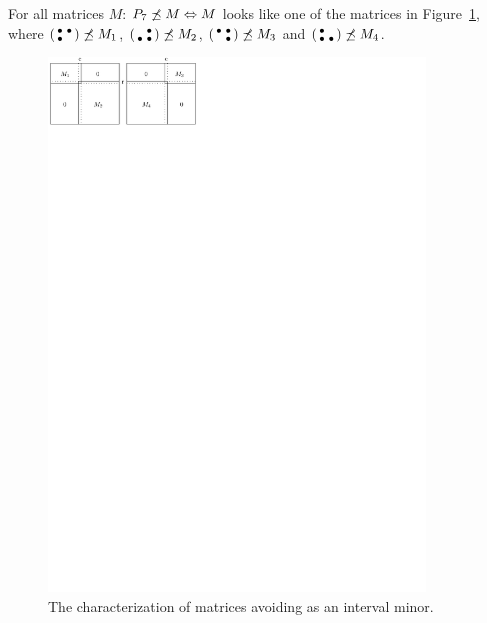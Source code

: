\begin{prop}
\label{prop:p33}
For all matrices $M$: $P_7\not\preceq M\Leftrightarrow M$ looks like one of the matrices in Figure~\ref{fig:p33}, where $\left(\begin{smallmatrix}\bullet&\bullet\\\bullet& \end{smallmatrix}\right)\not\preceq M_1$, $\left(\begin{smallmatrix} &\bullet\\\bullet&\bullet\end{smallmatrix}\right)\not\preceq M_2$, $\left(\begin{smallmatrix}\bullet&\bullet\\ &\bullet\end{smallmatrix}\right)\not\preceq M_3$ and $\left(\begin{smallmatrix}\bullet& \\\bullet&\bullet\end{smallmatrix}\right)\not\preceq M_4$.
\end{prop}
\begin{figure}[!ht]
\centering
\includegraphics[width=100mm]{img/p33.pdf}
\caption{The characterization of matrices avoiding \usebox{\smlmatb} as an interval minor.}
\label{fig:p33}
\end{figure}
